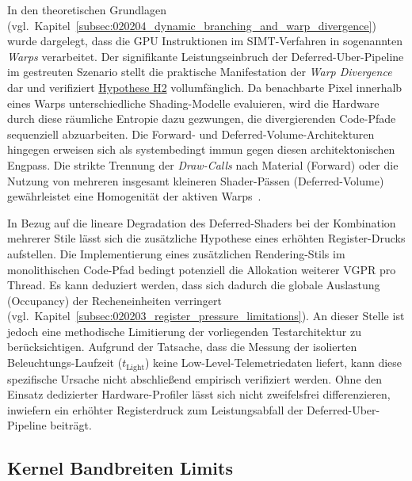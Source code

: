In den theoretischen Grundlagen (vgl.\ Kapitel~\ref{subsec:020204_dynamic_branching_and_warp_divergence}) wurde
dargelegt, dass die \ac{GPU} Instruktionen im \ac{SIMT}-Verfahren in sogenannten \textit{Warps} verarbeitet.
Der signifikante Leistungseinbruch der Deferred-Uber-Pipeline im gestreuten Szenario stellt die praktische
Manifestation der \textit{Warp Divergence} dar und verifiziert \hyperlink{hyp:H2}{Hypothese H2} vollumfänglich.
Da benachbarte Pixel innerhalb eines Warps unterschiedliche Shading-Modelle evaluieren, wird die Hardware durch diese
räumliche Entropie dazu gezwungen, die divergierenden Code-Pfade sequenziell abzuarbeiten.
Die Forward- und Deferred-Volume-Architekturen hingegen erweisen sich als systembedingt immun gegen diesen
architektonischen Engpass.
Die strikte Trennung der \textit{Draw-Calls} nach Material (Forward) oder die Nutzung von mehreren insgesamt
kleineren Shader-Pässen (Deferred-Volume) gewährleistet eine Homogenität der aktiven
Warps~\cite[S.~886]{akenine-mollerRealtimeRendering2019}.

In Bezug auf die lineare Degradation des Deferred-Shaders bei der Kombination mehrerer Stile lässt sich die
zusätzliche Hypothese eines erhöhten Register-Drucks aufstellen.
Die Implementierung eines zusätzlichen Rendering-Stils im monolithischen Code-Pfad bedingt potenziell die Allokation
weiterer \ac{VGPR} pro Thread.
Es kann deduziert werden, dass sich dadurch die globale Auslastung (Occupancy) der Recheneinheiten verringert
(vgl.~Kapitel~\ref{subsec:020203_register_pressure_limitations}).
An dieser Stelle ist jedoch eine methodische Limitierung der vorliegenden Testarchitektur zu berücksichtigen.
Aufgrund der Tatsache, dass die Messung der isolierten Beleuchtungs-Laufzeit ($t_{\text{Light}}$) keine
Low-Level-Telemetriedaten liefert, kann diese spezifische Ursache nicht abschließend empirisch verifiziert werden.
Ohne den Einsatz dedizierter Hardware-Profiler lässt sich nicht zweifelsfrei differenzieren, inwiefern ein erhöhter
Registerdruck zum Leistungsabfall der Deferred-Uber-Pipeline beiträgt.

\subsection{{Kernel Bandbreiten Limits}}
\label{subsec:050502_kernel_eval}

